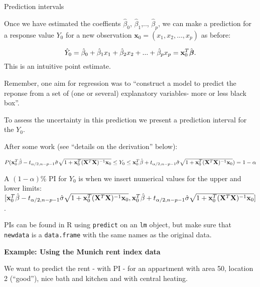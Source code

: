 \documentclass[ignorenonframetext,]{beamer}
\begin{document}
\begin{frame}

\begin{block}{Prediction intervals}

Once we have estimated the coeffients \(\hat\beta_0\),
\(\hat\beta_1\),.., \(\hat\beta_p\), we can make a prediction for a
response value \(Y_0\) for a new observation
\(\mathbf x_0 = (x_1, x_2, ..., x_p)\) as before:

\[\hat Y_0 = \hat \beta_0 + \hat \beta_1 x_1 + \hat \beta_2 x_2 + ... + \hat \beta_p x_p ={\bf x}_0^T \hat{\boldsymbol\beta}.\]
This is an intuitive point estimate.

Remember, one aim for regression was to ``construct a model to predict
the reponse from a set of (one or several) explanatory variables- more
or less black box''.

To assess the uncertainty in this prediction we present a prediction
interval for the \(Y_0\).

\end{block}

\end{frame}

\begin{frame}

After some work (see ``details on the derivation'' below):

\(P({\bf x}_0^T \hat{\beta}-t_{\alpha/2,n-p-1}\hat{\sigma}\sqrt{1+{\bf x}_0^T({\bf X}^T{\bf X})^{-1}{\bf x}_0} \le Y_0 \le {\bf x}_0^T \hat{\beta}+t_{\alpha/2,n-p-1}\hat{\sigma}\sqrt{1+{\bf x}_0^T({\bf X}^T{\bf X})^{-1}{\bf x}_0})=1-\alpha\)

A \((1-\alpha)\)\% PI for \(Y_0\) is when we insert numerical values for
the upper and lower limits:
\([{\bf x}_0^T \hat{\beta}-t_{\alpha/2,n-p-1}\hat{\sigma}\sqrt{1+{\bf x}_0^T({\bf X}^T{\bf X})^{-1}{\bf x}_0}, {\bf x}_0^T \hat{\beta}+t_{\alpha/2,n-p-1}\hat{\sigma}\sqrt{1+{\bf x}_0^T({\bf X}^T{\bf X})^{-1}{\bf x}_0}]\).

\end{frame}

\begin{frame}[fragile]

PIs can be found in R using \texttt{predict} on an \texttt{lm} object,
but make sure that \texttt{newdata} is a \texttt{data.frame} with the
same names as the original data.

\textbf{Example: Using the Munich rent index data}

We want to predict the rent - with PI - for an appartment with area 50,
location 2 (``good''), nice bath and kitchen and with central heating.

\end{frame}
\end{document}
